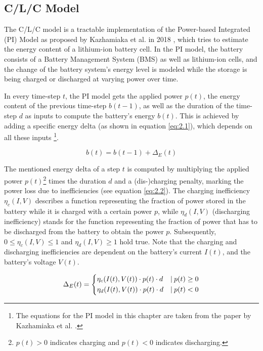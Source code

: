 \subsection{C/L/C Model}
\label{c_l_c_model}
The C/L/C model is a tractable implementation of the Power-based Integrated (PI) Model as proposed by Kazhamiaka et al. in 2018 \cite{kazhamiaka2018pimodel}, which tries to estimate the energy content of a lithium-ion battery cell. In the PI model, the battery consists of a Battery Management System (BMS) as well as lithium-ion cells, and the change of the battery system's energy level is modeled while the storage is being charged or discharged at varying power over time.

In every time-step $t$, the PI model gets the applied power $p(t)$, the energy content of the previous time-step $b(t-1)$, as well as the duration of the time-step $d$ as inputs to compute the battery's energy $b(t)$. This is achieved by adding a specific energy delta (as shown in equation \ref{eq:2.1}), which depends on all these inputs \footnote{The equations for the PI model in this chapter are taken from the paper by Kazhamiaka et al. \cite{kazhamiaka2018pimodel}.}.

\begin{equation}\label{eq:2.1}
    b(t) = b(t-1) + \Delta_E(t)
\end{equation}

The mentioned energy delta of a step $t$ is computed by multiplying the applied power $p(t)$\footnote{$p(t) > 0$ indicates charging and $p(t) < 0$ indicates discharging.} times the duration $d$ and a (dis-)charging penalty, marking the power loss due to inefficiencies (see equation \ref{eq:2.2}). The charging inefficiency $\eta_c(I, V)$ describes a function representing the fraction of power stored in the battery while it is charged with a certain power $p$, while $\eta_d(I, V)$ (discharging inefficiency) stands for the function representing the fraction of power that has to be discharged from the battery to obtain the power $p$. Subsequently, $0 \le \eta_c(I, V) \le 1$ and $\eta_d(I, V) \ge 1$ hold true. Note that the charging and discharging inefficiencies are dependent on the battery's current $I(t)$, and the battery's voltage $V(t)$.

\begin{equation}\label{eq:2.2}
    \Delta_E(t) = \begin{dcases} \eta_c(I(t),V(t))\cdot p(t)\cdot d & \vert\: p(t) \ge 0\\ \eta_d(I(t),V(t))\cdot p(t)\cdot d & \vert\: p(t) < 0
    \end{dcases}
\end{equation}

